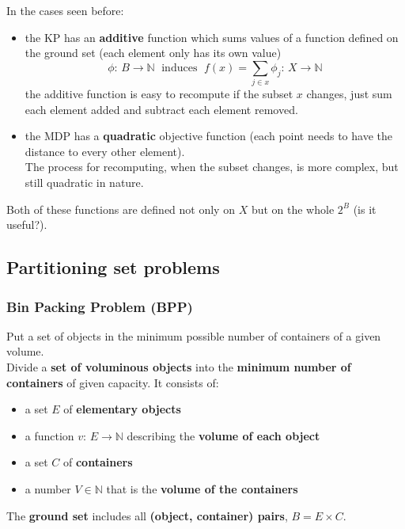 In the cases seen before: 
\begin{itemize}
	\item the KP has an \textbf{additive} function which sums values of a function defined on the ground set (each element only has its own value)
	$$ \phi : \, B \rightarrow \mathbb{N} \; \text{ induces } \; f(x) = \sum_{j \in x} \phi_j : \, X \rightarrow \mathbb{N} $$
	the additive function is easy to recompute if the subset $x$ changes, just sum each element added and subtract each element removed.\\
	
	\item the MDP has a \textbf{quadratic} objective function (each point needs to have the distance to every other element). \\
	The process for recomputing, when the subset changes, is more complex, but still quadratic in nature.\\
\end{itemize}
Both of these functions are defined not only on $X$ but on the whole $2^B$ (is it useful?).\\

\newpage

\subsection{Partitioning set problems}
\subsubsection{Bin Packing Problem (BPP)}
Put a set of objects in the minimum possible number of containers of a given volume.\\ 
Divide a \textbf{set of voluminous objects} into the \textbf{minimum number of containers} of given capacity. It consists of:
\begin{itemize}
	\item a set $E$ of \textbf{elementary objects}
	\item a function $v: \, E \rightarrow \mathbb{N}$ describing the \textbf{volume of each object}
	\item a set $C$ of \textbf{containers}
	\item a number $V \in \mathbb{N}$ that is the \textbf{volume of the containers}
\end{itemize}

The \textbf{ground set} includes all \textbf{(object, container) pairs}, $B = E \times C$.\\

